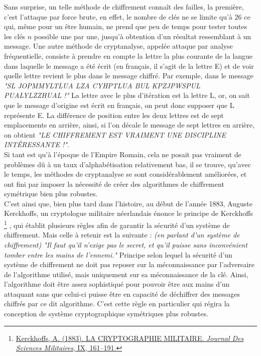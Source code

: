 \documentclass{article}
\begin{document}
\newpage

Sans surprise, un telle méthode de chiffrement connaît des failles, la première, c'est l'attaque par force brute, en effet, le nombre de clés ne se limite qu'à $26$ ce qui, même pour un être humain, ne prend que peu de temps pour tester toutes les clés $n$ possible une par une, jusqu'à obtention d'un résultat ressemblant à un message. Une autre méthode de cryptanalyse, appelée attaque par analyse fréquentielle, consiste à prendre en compte la lettre la plus courante de la langue dans laquelle le message a été écrit (en français, il s'agit de la lettre E) et de voir quelle lettre revient le plus dans le message chiffré. Par exemple, dans le message \textit{"SL JOPMMYLTLUA LZA CYHPTLUA BUL KPZJPWSPUL PUALYLZZHUAL !"} La lettre avec le plus d'itération est la lettre L, or, on sait que le message d'origine est écrit en français, on peut donc supposer que L représente E. La différence de position entre les deux lettres est de sept emplacements en arrière, ainsi, si l'on décale le message de sept lettres en arrière, on obtient \textit{"LE CHIFFREMENT EST VRAIMENT UNE DISCIPLINE INTÉRESSANTE !"}. \\

Si tant est qu'à l'époque de l'Empire Romain, cela ne posait pas vraiment de problèmes dû à un taux d'alphabétisation relativement bas, il se trouve, qu'avec le temps, les méthodes de cryptanalyse se sont considérablement améliorées, et ont fini par imposer la nécessité de créer des algorithmes de chiffrement symétrique bien plus robustes. \\

C'est ainsi que, bien plus tard dans l'histoire, au début de l'année 1883, Auguste Kerckhoffs, un cryptologue militaire néerlandais énonce le principe de Kerckhoffs 
\footnote{\href{https://www.petitcolas.net/kerckhoffs/crypto_militaire_1.pdf}{Kerckhoffs, A. (1883). LA CRYPTOGRAPHIE MILITAIRE. \textit{Journal Des Sciences Militaires}, IX, 161–191.}}
, qui établit plusieurs règles afin de garantir la sécurité d'un système de chiffrement. Mais celle à retenir est la suivante : \textit{(en parlant d'un système de chiffrement) "Il faut qu’il n’exige pas le secret, et qu’il puisse sans inconvénient tomber entre les mains de l’ennemi."} Principe selon lequel la sécurité d'un système de chiffrement ne doit pas reposer sur la méconnaissance par l'adversaire de l'algorithme utilisé, mais uniquement sur sa méconnaissance de la clé. Ainsi, l'algorithme doit être assez sophistiqué pour pouvoir être aux mains d'un attaquant sans que celui-ci puisse être en capacité de déchiffrer des messages chiffrés par ce dit algorithme. C'est cette règle en particulier qui régira la conception de système cryptographique symétriques plus robustes.
\end{document}
